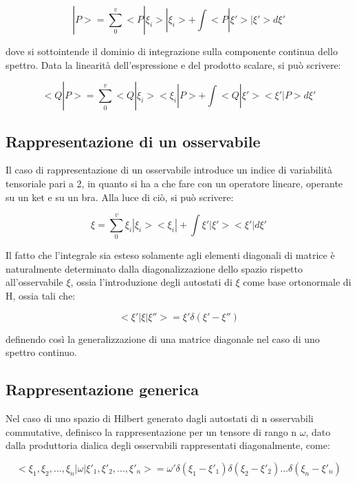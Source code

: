 \documentclass{article}
\begin{document}
\begin{equation}
    |P>= \sum_{0}^{v} <P|\xi_i>|\xi_i>+ \int <P|\xi'>|\xi'>d\xi'
\end{equation}

dove si sottointende il dominio di integrazione sulla componente continua dello spettro.
Data la linearità dell'espressione e del prodotto scalare, si può scrivere:

\begin{equation}
    <Q|P>= \sum_{0}^{v} <Q|\xi_i><\xi_i|P>+ \int <Q|\xi'><\xi'|P>d\xi'
\end{equation}


\subsection{Rappresentazione di un osservabile}
Il caso di rappresentazione di un osservabile introduce un indice di variabilità tensoriale pari a 2, in quanto si ha a che fare con un operatore lineare, operante su un ket e su un bra.
Alla luce di ciò, si può scrivere:

\begin{equation}
    \xi = \sum_{0}^{v} \xi_i|\xi_i><\xi_i|+ \int \xi'|\xi'><\xi'|d\xi'
\end{equation}

Il fatto che l'integrale sia esteso solamente agli elementi diagonali di matrice è naturalmente determinato dalla diagonalizzazione
dello spazio rispetto all'osservabile $\xi$, ossia l'introduzione degli autostati di $\xi$ come base ortonormale di H, ossia tali che:

\begin{equation}
    <\xi' | \xi | \xi''>= \xi' \delta(\xi'-\xi'')
\end{equation}

definendo così la generalizzazione di una matrice diagonale nel caso di uno spettro continuo.

\subsection{Rappresentazione generica}

Nel caso di uno spazio di Hilbert generato dagli autostati di n osservabili commutative, definisco la rappresentazione per
un tensore di rango n $\omega$, dato dalla produttoria dialica degli osservabili rappresentati diagonalmente, come:

\begin{equation}
    <\xi_1,\xi_2,...,\xi_n|\omega|\xi'_1,\xi'_2,...,\xi'_n> = \omega' \delta(\xi_1-\xi'_1)\delta(\xi_2-\xi'_2)...\delta(\xi_n-\xi'_n)
\end{equation}
\end{document}
